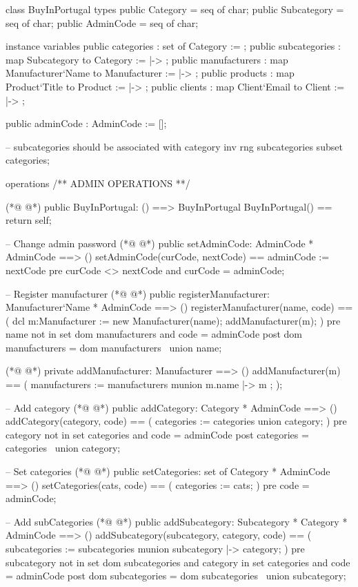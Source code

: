 \begin{vdmpp}[breaklines=true]
class BuyInPortugal
types
 public Category = seq of char;
 public Subcategory = seq of char;
 public AdminCode = seq of char;

instance variables
 public categories : set of Category := {};
 public subcategories : map Subcategory to Category := { |-> };
 public manufacturers : map Manufacturer`Name to Manufacturer := { |-> };
 public products : map Product`Title to Product := { |-> };
 public clients : map Client`Email to Client := { |-> };
 
 public adminCode : AdminCode := [];
 
 -- subcategories should be associated with category
  inv rng subcategories subset categories;

operations
 /** ADMIN OPERATIONS **/
 
(*@
\label{BuyInPortugal:22}
@*)
 public BuyInPortugal: () ==> BuyInPortugal
 BuyInPortugal() ==
  return self;
 
 -- Change admin password
(*@
\label{setAdminCode:27}
@*)
 public setAdminCode: AdminCode * AdminCode ==> ()
 setAdminCode(curCode, nextCode) ==
  adminCode := nextCode
 pre curCode <> nextCode
  and curCode = adminCode;
 
 -- Register manufacturer
(*@
\label{registerManufacturer:34}
@*)
 public registerManufacturer: Manufacturer`Name * AdminCode ==> ()
 registerManufacturer(name, code) == (
  dcl m:Manufacturer := new Manufacturer(name);
  addManufacturer(m);
 )
 pre name not in set dom manufacturers
  and code = adminCode
 post dom manufacturers = dom manufacturers~ union {name};

(*@
\label{addManufacturer:43}
@*)
 private addManufacturer: Manufacturer ==> ()
 addManufacturer(m) == (
  manufacturers := manufacturers munion { m.name |-> m };
 );
 
 -- Add category
(*@
\label{addCategory:49}
@*)
 public addCategory: Category * AdminCode ==> ()
 addCategory(category, code) == (
  categories := categories union {category};
 )
 pre category not in set categories
  and code = adminCode
 post categories = categories~ union {category};
 
 -- Set categories
(*@
\label{setCategories:58}
@*)
 public setCategories: set of Category * AdminCode ==> ()
 setCategories(cats, code) == (
  categories := cats;
 )
 pre code = adminCode;
 
 -- Add subCategories
(*@
\label{addSubcategory:65}
@*)
 public addSubcategory: Subcategory * Category * AdminCode ==> ()
 addSubcategory(subcategory, category, code) == (
  subcategories := subcategories munion {subcategory |-> category};
 )
 pre subcategory not in set dom subcategories
  and category in set categories
  and code = adminCode
 post dom subcategories = dom subcategories~ union {subcategory};
 

\end{vdmpp}
